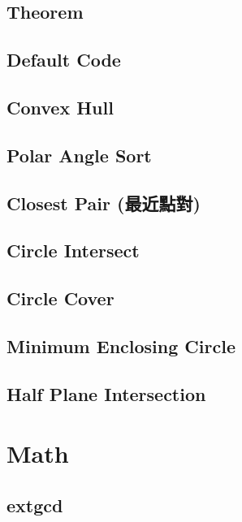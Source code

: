 \subsection{Theorem}

\subsection{Default Code}

\subsection{Convex Hull}

\subsection{Polar Angle Sort}

\subsection{Closest Pair (最近點對)}

\subsection{Circle Intersect}

\subsection{Circle Cover}

\subsection{Minimum Enclosing Circle}

% 
\subsection{Half Plane Intersection}


\section{Math}
\subsection{extgcd}

